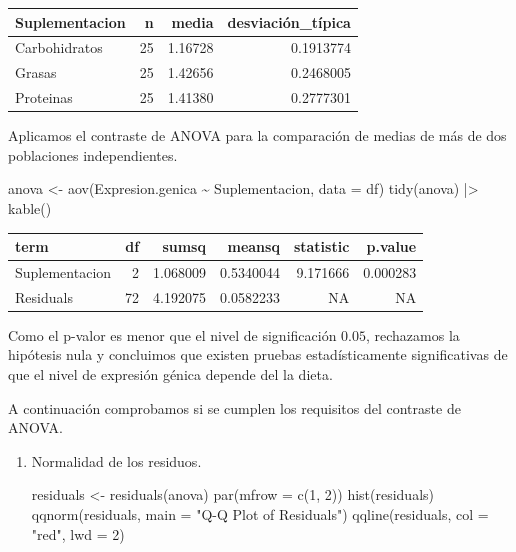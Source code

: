 \documentclass[
  a4paper,
]{scrreport}
\newenvironment{Shaded}{\begin{snugshade}}{\end{snugshade}}
\newcommand{\AttributeTok}[1]{\textcolor[rgb]{0.40,0.45,0.13}{#1}}
\newcommand{\DecValTok}[1]{\textcolor[rgb]{0.68,0.00,0.00}{#1}}
\newcommand{\FunctionTok}[1]{\textcolor[rgb]{0.28,0.35,0.67}{#1}}
\newcommand{\NormalTok}[1]{\textcolor[rgb]{0.00,0.23,0.31}{#1}}
\newcommand{\OtherTok}[1]{\textcolor[rgb]{0.00,0.23,0.31}{#1}}
\newcommand{\SpecialCharTok}[1]{\textcolor[rgb]{0.37,0.37,0.37}{#1}}
\newcommand{\StringTok}[1]{\textcolor[rgb]{0.13,0.47,0.30}{#1}}
\theoremstyle{definition}
\theoremstyle{remark}
\begin{document}
\begin{tcolorbox}
\begin{longtable}[]{@{}lrrr@{}}
\toprule\noalign{}
Suplementacion & n & media & desviación\_típica \\
\midrule\noalign{}
\endhead
\bottomrule\noalign{}
\endlastfoot
Carbohidratos & 25 & 1.16728 & 0.1913774 \\
Grasas & 25 & 1.42656 & 0.2468005 \\
Proteinas & 25 & 1.41380 & 0.2777301 \\
\end{longtable}

Aplicamos el contraste de ANOVA para la comparación de medias de más de
dos poblaciones independientes.

\begin{Shaded}
\begin{Highlighting}[]
\NormalTok{anova }\OtherTok{\textless{}{-}} \FunctionTok{aov}\NormalTok{(Expresion.genica }\SpecialCharTok{\textasciitilde{}}\NormalTok{ Suplementacion, }\AttributeTok{data =}\NormalTok{ df)}
\FunctionTok{tidy}\NormalTok{(anova) }\SpecialCharTok{|\textgreater{}} 
    \FunctionTok{kable}\NormalTok{()}
\end{Highlighting}
\end{Shaded}

\begin{longtable}[]{@{}lrrrrr@{}}
\toprule\noalign{}
term & df & sumsq & meansq & statistic & p.value \\
\midrule\noalign{}
\endhead
\bottomrule\noalign{}
\endlastfoot
Suplementacion & 2 & 1.068009 & 0.5340044 & 9.171666 & 0.000283 \\
Residuals & 72 & 4.192075 & 0.0582233 & NA & NA \\
\end{longtable}

Como el p-valor es menor que el nivel de significación \(0.05\),
rechazamos la hipótesis nula y concluimos que existen pruebas
estadísticamente significativas de que el nivel de expresión génica
depende del la dieta.

A continuación comprobamos si se cumplen los requisitos del contraste de
ANOVA.

\begin{enumerate}
\def\labelenumi{\alph{enumi}.}
\item
  Normalidad de los residuos.

\begin{Shaded}
\begin{Highlighting}[]
\NormalTok{residuals }\OtherTok{\textless{}{-}} \FunctionTok{residuals}\NormalTok{(anova)}
\FunctionTok{par}\NormalTok{(}\AttributeTok{mfrow =} \FunctionTok{c}\NormalTok{(}\DecValTok{1}\NormalTok{, }\DecValTok{2}\NormalTok{))  }
\FunctionTok{hist}\NormalTok{(residuals)}
\FunctionTok{qqnorm}\NormalTok{(residuals, }\AttributeTok{main =} \StringTok{"Q{-}Q Plot of Residuals"}\NormalTok{)}
\FunctionTok{qqline}\NormalTok{(residuals, }\AttributeTok{col =} \StringTok{"red"}\NormalTok{, }\AttributeTok{lwd =} \DecValTok{2}\NormalTok{)}
\end{Highlighting}
\end{Shaded}


\end{enumerate}
\end{tcolorbox}
\end{document}
